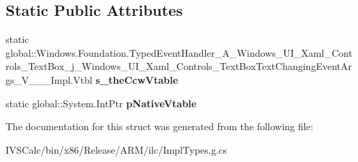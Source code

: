 \subsection*{Static Public Attributes}
\begin{DoxyCompactItemize}
\item 
\mbox{\label{struct_windows_1_1_foundation_1_1_typed_event_handler___a___windows___u_i___xaml___controls___tef88d8535df07672acd9dfc6e3861f1e1_a147e8cc354cca68ef6d05f3e3054a658}} 
static global\+::\+Windows.\+Foundation.\+Typed\+Event\+Handler\+\_\+\+A\+\_\+\+Windows\+\_\+\+U\+I\+\_\+\+Xaml\+\_\+\+Controls\+\_\+\+Text\+Box\+\_\+j\+\_\+\+Windows\+\_\+\+U\+I\+\_\+\+Xaml\+\_\+\+Controls\+\_\+\+Text\+Box\+Text\+Changing\+Event\+Args\+\_\+\+V\+\_\+\+\_\+\+\_\+\+Impl.\+Vtbl {\bfseries s\+\_\+the\+Ccw\+Vtable}
\item 
\mbox{\label{struct_windows_1_1_foundation_1_1_typed_event_handler___a___windows___u_i___xaml___controls___tef88d8535df07672acd9dfc6e3861f1e1_a702c12b120e3a9a784cfef9324fdf343}} 
static global\+::\+System.\+Int\+Ptr {\bfseries p\+Native\+Vtable}
\end{DoxyCompactItemize}


The documentation for this struct was generated from the following file\+:\begin{DoxyCompactItemize}
\item 
I\+V\+S\+Calc/bin/x86/\+Release/\+A\+R\+M/ilc/Impl\+Types.\+g.\+cs\end{DoxyCompactItemize}
